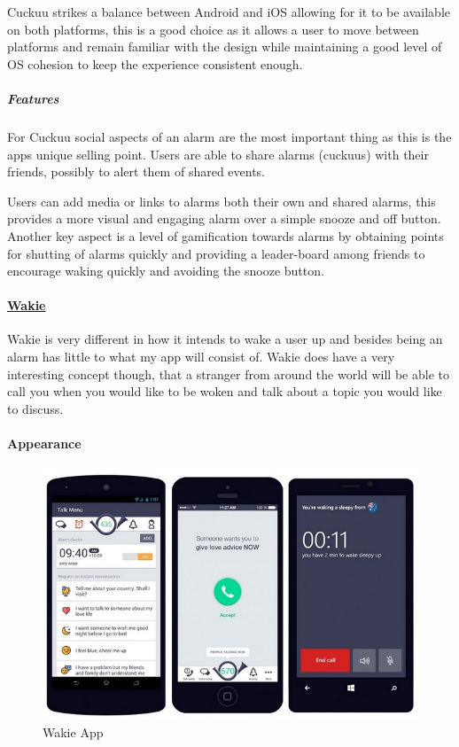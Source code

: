 Cuckuu strikes a balance between Android and iOS allowing for it to be
available on both platforms, this is a good choice as it allows a user
to move between platforms and remain familiar with the design while
maintaining a good level of OS cohesion to keep the experience
consistent enough.

\subparagraph{Features}\label{features-1}

For Cuckuu social aspects of an alarm are the most important thing as
this is the apps unique selling point. Users are able to share alarms
(cuckuus) with their friends, possibly to alert them of shared events.

Users can add media or links to alarms both their own and shared alarms,
this provides a more visual and engaging alarm over a simple snooze and
off button. Another key aspect is a level of gamification towards alarms
by obtaining points for shutting of alarms quickly and providing a
leader-board among friends to encourage waking quickly and avoiding the
snooze button.

\paragraph{\texorpdfstring{\href{https://wakie.com/}{Wakie}}{Wakie}}\label{wakie}

Wakie is very different in how it intends to wake a user up and besides
being an alarm has little to what my app will consist of. Wakie does
have a very interesting concept though, that a stranger from around the
world will be able to call you when you would like to be woken and talk
about a topic you would like to discuss.

\paragraph{Appearance}\label{appearance-2}

\begin{figure}[htbp]
\centering
\includegraphics{Images/wakie.jpg}
\caption{Wakie App}
\end{figure}


